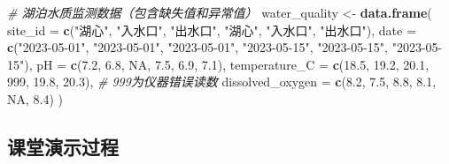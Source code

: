 \documentclass[
  twoside]{book}
\newenvironment{Shaded}{\begin{snugshade}}{\end{snugshade}}
\newcommand{\AttributeTok}[1]{\textcolor[rgb]{0.13,0.29,0.53}{#1}}
\newcommand{\CommentTok}[1]{\textcolor[rgb]{0.56,0.35,0.01}{\textit{#1}}}
\newcommand{\ConstantTok}[1]{\textcolor[rgb]{0.56,0.35,0.01}{#1}}
\newcommand{\DecValTok}[1]{\textcolor[rgb]{0.00,0.00,0.81}{#1}}
\newcommand{\FloatTok}[1]{\textcolor[rgb]{0.00,0.00,0.81}{#1}}
\newcommand{\FunctionTok}[1]{\textcolor[rgb]{0.13,0.29,0.53}{\textbf{#1}}}
\newcommand{\NormalTok}[1]{#1}
\newcommand{\OtherTok}[1]{\textcolor[rgb]{0.56,0.35,0.01}{#1}}
\newcommand{\StringTok}[1]{\textcolor[rgb]{0.31,0.60,0.02}{#1}}
\begin{document}
\begin{Shaded}
\begin{Highlighting}[]
\CommentTok{\# 湖泊水质监测数据（包含缺失值和异常值）}
\NormalTok{water\_quality }\OtherTok{\textless{}{-}} \FunctionTok{data.frame}\NormalTok{(}
  \AttributeTok{site\_id =} \FunctionTok{c}\NormalTok{(}\StringTok{"湖心"}\NormalTok{, }\StringTok{"入水口"}\NormalTok{, }\StringTok{"出水口"}\NormalTok{, }\StringTok{"湖心"}\NormalTok{, }\StringTok{"入水口"}\NormalTok{, }\StringTok{"出水口"}\NormalTok{),}
  \AttributeTok{date =} \FunctionTok{c}\NormalTok{(}\StringTok{"2023{-}05{-}01"}\NormalTok{, }\StringTok{"2023{-}05{-}01"}\NormalTok{, }\StringTok{"2023{-}05{-}01"}\NormalTok{, }\StringTok{"2023{-}05{-}15"}\NormalTok{, }\StringTok{"2023{-}05{-}15"}\NormalTok{, }\StringTok{"2023{-}05{-}15"}\NormalTok{),}
  \AttributeTok{pH =} \FunctionTok{c}\NormalTok{(}\FloatTok{7.2}\NormalTok{, }\FloatTok{6.8}\NormalTok{, }\ConstantTok{NA}\NormalTok{, }\FloatTok{7.5}\NormalTok{, }\FloatTok{6.9}\NormalTok{, }\FloatTok{7.1}\NormalTok{),}
  \AttributeTok{temperature\_C =} \FunctionTok{c}\NormalTok{(}\FloatTok{18.5}\NormalTok{, }\FloatTok{19.2}\NormalTok{, }\FloatTok{20.1}\NormalTok{, }\DecValTok{999}\NormalTok{, }\FloatTok{19.8}\NormalTok{, }\FloatTok{20.3}\NormalTok{),  }\CommentTok{\# 999为仪器错误读数}
  \AttributeTok{dissolved\_oxygen =} \FunctionTok{c}\NormalTok{(}\FloatTok{8.2}\NormalTok{, }\FloatTok{7.5}\NormalTok{, }\FloatTok{8.8}\NormalTok{, }\FloatTok{8.1}\NormalTok{, }\ConstantTok{NA}\NormalTok{, }\FloatTok{8.4}\NormalTok{)}
\NormalTok{)}
\end{Highlighting}
\end{Shaded}

\hypertarget{ux8bfeux5802ux6f14ux793aux8fc7ux7a0b-5}{%
\subsection{课堂演示过程}\label{ux8bfeux5802ux6f14ux793aux8fc7ux7a0b-5}}
\end{document}

